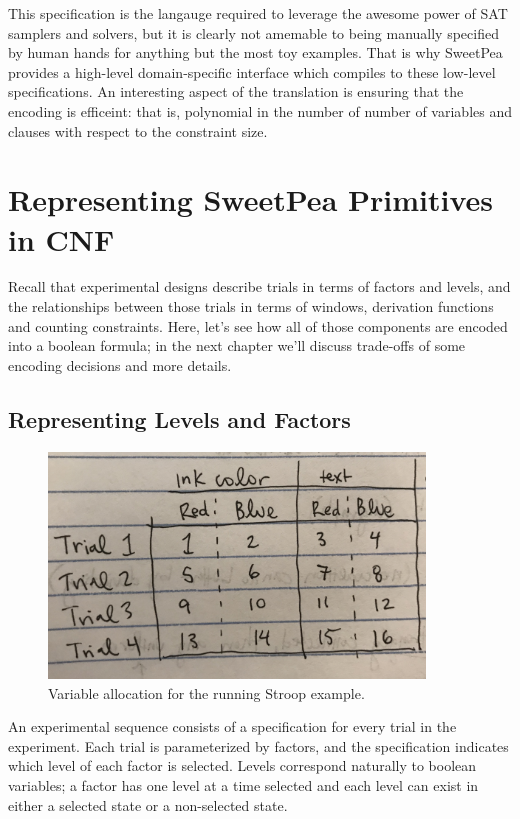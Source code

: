 This specification is the langauge required to leverage the awesome power of SAT samplers and solvers, but it is clearly not amemable to being manually specified by human hands for anything but the most toy examples. That is why SweetPea provides a high-level domain-specific interface which compiles to these low-level specifications. An interesting aspect of the translation is ensuring that the encoding is efficeint: that is, polynomial in the number of number of variables and clauses with respect to the constraint size.

\section{Representing SweetPea Primitives in CNF}

Recall that experimental designs describe trials in terms of factors and levels, and the relationships between those trials in terms of windows, derivation functions and counting constraints. Here, let's see how all of those components are encoded into a boolean formula; in the next chapter we'll discuss trade-offs of some encoding decisions and more details.

\subsection{Representing Levels and Factors}

\begin{figure}[t]
    \centerline{\includegraphics[origin=c,width=10cm]{encoding_strupe_vars}}
    \caption{Variable allocation for the running Stroop example.}%
    \label{fig:encoding_strupe_vars}%
\end{figure}

An experimental sequence consists of a specification for every trial in the experiment. Each trial is parameterized by factors, and the specification indicates which level of each factor is selected. Levels correspond naturally to boolean variables; a factor has one level at a time selected and each level can exist in either a selected state or a non-selected state.

